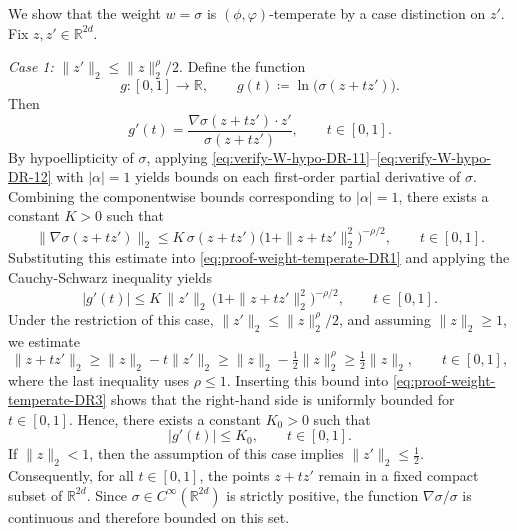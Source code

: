 \documentclass[a4paper,12pt]{article}
\newcommand{\R}{\mathbb{R}}
\begin{document}
We show that the weight $w=\sigma$ is $(\phi,\varphi)$-temperate by a case
distinction on $z'$.
Fix $z,z'\in\R^{2d}$.

\medskip
\noindent\emph{Case 1:} 
    $\|z'\|_2 \leq \|z\|_2^\rho /2$.
Define the function
\[
    g \colon [0,1] \to \R,
    \qquad
    g(t) \coloneqq \ln\bigl(\sigma(z+t z')\bigr).
\]
Then
\begin{equation}\label{eq:proof-weight-temperate-DR1}
    g'(t)
    =
    \frac{\nabla \sigma(z+t z') \cdot z'}{\sigma(z+t z')},
    \qquad t\in[0,1].
\end{equation}
By hypoellipticity of $\sigma$, applying
\eqref{eq:verify-W-hypo-DR-11}--\eqref{eq:verify-W-hypo-DR-12} with $|\alpha|=1$
yields bounds on each first-order partial derivative of $\sigma$.
Combining the componentwise bounds corresponding to $|\alpha|=1$, there exists a
constant $K>0$ such that
\begin{equation}\label{eq:proof-weight-temperate-DR2}
    \|\nabla \sigma(z+t z')\|_2
    \le
    K\,\sigma(z+t z')
    \bigl(1+\|z+t z'\|_2^2\bigr)^{-\rho/2},
    \qquad t\in[0,1].
\end{equation}
Substituting this estimate into \eqref{eq:proof-weight-temperate-DR1} and applying
the Cauchy-Schwarz inequality yields
\begin{equation}\label{eq:proof-weight-temperate-DR3}
    |g'(t)|
    \le
    K\,\|z'\|_2\,\bigl(1+\|z+t z'\|_2^2\bigr)^{-\rho/2},
    \qquad t\in[0,1].
\end{equation}
Under the restriction of this case, $\|z'\|_2 \le \|z\|_2^\rho/2$, and assuming
$\|z\|_2\ge 1$, we estimate
\[
\|z+t z'\|_2
\ge
\|z\|_2 - t\|z'\|_2
\ge
\|z\|_2 - \tfrac12 \|z\|_2^\rho
\ge
\tfrac12 \|z\|_2,
\qquad t\in[0,1],
\]
where the last inequality uses $\rho\le 1$.
Inserting this bound into \eqref{eq:proof-weight-temperate-DR3} shows that the
right-hand side is uniformly bounded for $t\in[0,1]$. Hence, there exists a
constant $K_0>0$ such that
\begin{equation}\label{eq:g-uniform-bound}
    |g'(t)| \le K_0,
    \qquad t\in[0,1].
\end{equation}
If $\|z\|_2 < 1$, then the assumption of this case implies
\(
\|z'\|_2 \le \tfrac12.
\)
Consequently, for all $t\in[0,1]$, the points $z+t z'$ remain in a fixed compact
subset of $\R^{2d}$.
Since $\sigma\in C^\infty(\R^{2d})$ is strictly positive, the function
$\nabla\sigma/\sigma$ is continuous and therefore bounded on this set.
\end{document}
